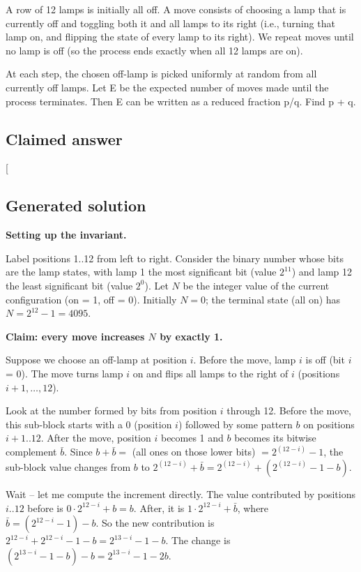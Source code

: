 \documentclass[
  11pt,
  letterpaper,
]{article}
\begin{document}
A row of 12 lamps is initially all off. A move consists of choosing a
lamp that is currently off and toggling both it and all lamps to its
right (i.e., turning that lamp on, and flipping the state of every lamp
to its right). We repeat moves until no lamp is off (so the process ends
exactly when all 12 lamps are on).

At each step, the chosen off-lamp is picked uniformly at random from all
currently off lamps. Let E be the expected number of moves made until
the process terminates. Then E can be written as a reduced fraction p/q.
Find p + q.

\subsection{Claimed answer}\label{claimed-answer-10}

{[}\boxed{4109}{]}

\subsection{Generated solution}\label{generated-solution-10}

\textbf{Setting up the invariant.}

Label positions 1..12 from left to right. Consider the binary number
whose bits are the lamp states, with lamp 1 the most significant bit
(value \(2^{11}\)) and lamp 12 the least significant bit (value
\(2^0\)). Let \(N\) be the integer value of the current configuration
(on = 1, off = 0). Initially \(N = 0\); the terminal state (all on) has
\(N = 2^{12} - 1 = 4095\).

\textbf{Claim: every move increases \(N\) by exactly 1.}

Suppose we choose an off-lamp at position \(i\). Before the move, lamp
\(i\) is off (bit \(i\) = 0). The move turns lamp \(i\) on and flips all
lamps to the right of \(i\) (positions \(i+1,\dots,12\)).

Look at the number formed by bits from position \(i\) through 12. Before
the move, this sub-block starts with a 0 (position \(i\)) followed by
some pattern \(b\) on positions \(i+1..12\). After the move, position
\(i\) becomes 1 and \(b\) becomes its bitwise complement \(\bar b\).
Since \(b + \bar b =\) (all ones on those lower bits)
\(= 2^{(12-i)} - 1\), the sub-block value changes from \(b\) to
\(2^{(12-i)} + \bar b = 2^{(12-i)} + (2^{(12-i)}-1 - b)\).

Wait -- let me compute the increment directly. The value contributed by
positions \(i..12\) before is \(0\cdot 2^{12-i} + b = b\). After, it is
\(1\cdot 2^{12-i} + \bar b\), where \(\bar b = (2^{12-i}-1) - b\). So
the new contribution is
\(2^{12-i} + 2^{12-i} - 1 - b = 2^{13-i} - 1 - b\). The change is
\((2^{13-i} - 1 - b) - b = 2^{13-i} - 1 - 2b\).
\end{document}
